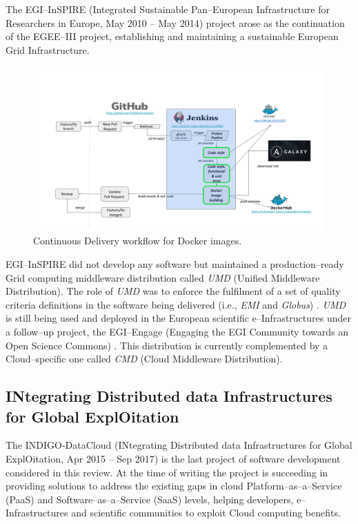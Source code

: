 \documentclass[journal]{IEEEtran}
\begin{document}
The EGI--InSPIRE (Integrated Sustainable Pan--European Infrastructure for
Researchers in Europe, May 2010 -- May 2014) project \cite{cordis:egi-inspire}
arose as the continuation of the EGEE--III project, establishing and
maintaining a sustainable European Grid Infrastructure.

\begin{figure}[ht]
\centering
\includegraphics[width=\textwidth]{images/devops.png}
\caption{Continuous Delivery workflow for Docker images.}
\label{fig:fig_CD}
\end{figure}


EGI--InSPIRE did not
develop any software but maintained a production--ready Grid computing
middleware distribution called {\sl UMD} (Unified Middleware Distribution).
The role of {\sl UMD} was to enforce the fulfilment of a set of quality
criteria definitions \cite{egi-qc} in the software being delivered (i.e.,
{\sl EMI} and {\sl Globus}) \cite{mario}. {\sl UMD} is still being used and
deployed in the European scientific e--Infrastructures under a follow--up
project, the EGI--Engage (Engaging the EGI Community towards an Open Science
Commons) \cite{cordis:egi-engage}. This distribution is currently complemented
by a Cloud--specific one called {\sl CMD} (Cloud Middleware Distribution).

\subsection{INtegrating Distributed data Infrastructures for Global
ExplOitation}

The INDIGO-DataCloud (INtegrating Distributed data Infrastructures for Global
ExplOitation, Apr 2015 -- Sep 2017) \cite{cordis:indigo} is the last
project of software development considered in this review. At the time of writing
the project is succeeding in providing solutions to address the existing gaps in
cloud Platform--as--a--Service (PaaS) and Software--as--a--Service (SaaS) levels,
helping developers, e--Infrastructures and scientific communities to exploit
Cloud computing benefits.
\end{document}
